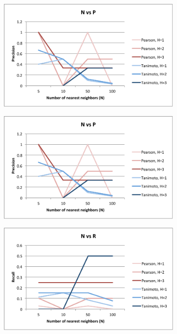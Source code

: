 \documentclass{article}
\begin{document}
\begin{figure}[H!]
\centering
\begin{subfigure}{.4\textwidth}
  \centering
  \includegraphics[width=\linewidth]{img/nvp.pdf}
  \label{fig:nvp}
\end{subfigure}%
\begin{subfigure}{.4\textwidth}
  \centering
  \includegraphics[width=\linewidth]{img/nvp.pdf}
  \label{fig:tvp}
\end{subfigure}
\begin{subfigure}{.4\textwidth}
  \centering
  \includegraphics[width=\linewidth]{img/nvr.pdf}

\end{subfigure}
\end{figure}
\end{document}
